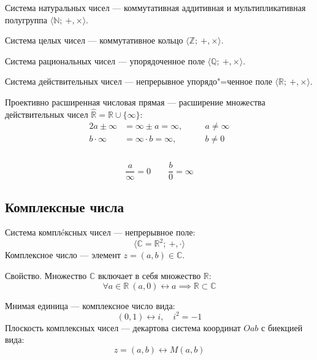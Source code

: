 {\bold Система натуральных чисел} --- коммутативная аддитивная и мультипликативная полугруппа $\langle\mathbb{N};\ +,\times\rangle$.\par

{\bold Система целых чисел} --- коммутативное кольцо $\langle\mathbb{Z};\ +,\times\rangle$.
\par

{\bold Система рациональных чисел} --- упорядоченное поле $\langle\mathbb{Q};\ +,\times
\rangle$.\par

{\bold Система действительных чисел} --- непрерывное упорядо"=ченное поле $\langle\mathbb
{R};\ +,\times\rangle$.

{\bold Проективно расширенная числовая прямая} --- расширение множества действительных 
чисел $\widehat{\mathbb{R}}=\mathbb{R}\cup\{\infty\}$:
\begin{alignat*}{2}
a\pm\infty&=\infty\pm a=\infty,\quad &&a\neq\infty\\
b\cdot\infty&=\infty\cdot b=\infty, &&b\neq 0\\
\end{alignat*}\\[-26pt]
$$\frac{a}{\infty}=0\quad\quad\frac{b}{0}=\infty$$

\newpage
\subsection{Комплексные числа}

{\bold Система комплéксных чисел} --- непрерывное поле:
$$\langle\mathbb{C}=\mathbb{R}^2;\ +,\cdot\rangle$$
{\bold Комплексное число} --- элемент $z=(a,b)\in\mathbb{C}$.
\begin{theorem}
{\bold Свойство.} Множество $\mathbb{C}$ включает в себя множество $\mathbb{R}$:
$$\forall a\in\mathbb{R}\ (a,0)\leftrightarrow a\implies\mathbb{R}\subset\mathbb{C}$$
\end{theorem}
{\bold Мнимая единица} --- комплексное число вида:
$$(0,1)\leftrightarrow i,\quad i^2=-1$$
{\bold Плоскость комплексных чисел} --- декартова система координат $Oab$ с биекцией вида:
$$z=(a,b)\leftrightarrow M(a,b)$$

